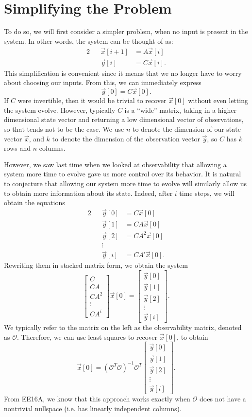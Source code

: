 \documentclass[letterpaper]{article}
\theoremstyle{remark}
\newcommand{\mat}[1]{\ensuremath{\begin{bmatrix}#1\end{bmatrix}}}
\newcommand{\eqn}[1]{\begin{alignat*}{2}#1\end{alignat*}}
\begin{document}
\section{Simplifying the Problem}
To do so, we will first consider a simpler problem, when no input is present in the system. In other words, the system can be thought of as:
\eqn{
    && \vec{x}[i + 1] &= A\vec{x}[i] \\
    && \vec{y}[i] &= C\vec{x}[i].
}
This simplification is convenient since it means that we no longer have to worry about choosing our inputs. From this, we can immediately express
\[
    \vec{y}[0] = C\vec{x}[0].
\]
If $C$ were invertible, then it would be trivial to recover $\vec{x}[0]$ without even letting the system evolve. However, typically $C$ is a ``wide'' matrix, taking in a higher dimensional state vector and returning a low dimensional vector of observations, so that tends not to be the case. We use $n$ to denote the dimension of our state vector $\vec{x}$, and $k$ to denote the dimension of the observation vector $\vec{y}$, so $C$ has $k$ rows and $n$ columns.

However, we saw last time when we looked at observability that allowing a system more time to evolve gave us more control over its behavior. It is natural to conjecture that allowing our system more time to evolve will similarly allow us to obtain more information about its state. Indeed, after $i$ time steps, we will obtain the equations
\eqn{
    && \vec{y}[0] &= C\vec{x}[0] \\
    && \vec{y}[1] &= CA\vec{x}[0] \\
    && \vec{y}[2] &= CA^2\vec{x}[0] \\
    && \vdots \\
    && \vec{y}[i] &= CA^i\vec{x}[0].
}
Rewriting them in stacked matrix form, we obtain the system
\[
    \mat{C \\ CA \\ CA^2 \\ \vdots \\ CA^i} \vec{x}[0] = \mat{\vec{y}[0] \\ \vec{y}[1] \\ \vec{y}[2] \\ \vdots \\ \vec{y}[i]}.
\]
We typically refer to the matrix on the left as the observability matrix, denoted as $\mathscr{O}$. Therefore, we can use least squares to recover $\vec{x}[0]$, to obtain
\[
    \vec{x}[0] = (\mathscr{O}^T\mathscr{O})^{-1}\mathscr{O}^T \mat{\vec{y}[0] \\ \vec{y}[1] \\ \vec{y}[2] \\ \vdots \\ \vec{y}[i]}.
\]
From EE16A, we know that this approach works exactly when $\mathscr{O}$ does not have a nontrivial nullspace (i.e. has linearly independent columns).
\end{document}
